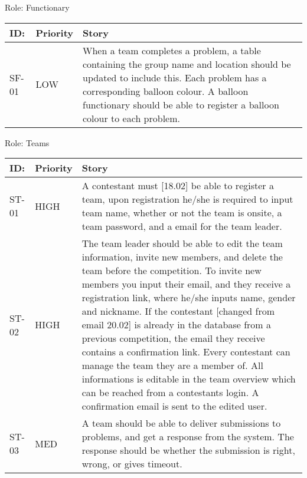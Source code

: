 \bigskip

Role: Functionary


\bigskip

\begin{flushleft}
\tablehead{}
\begin{supertabular}{|p{0.1\textwidth}|p{0.1\textwidth}|p{0.8\textwidth}|}
\hline
ID: &
Priority &
Story\\\hline
SF{}-01 &
LOW &
When a team completes a problem, a table containing the group name and
location should be updated to include this. Each problem has a
corresponding balloon colour. A balloon functionary should be able to
register a balloon colour to each problem.\\\hline
\end{supertabular}
\end{flushleft}

\bigskip


\bigskip

Role: Teams

\begin{flushleft}
\tablehead{}
\begin{supertabular}{|p{0.1\textwidth}|p{0.1\textwidth}|p{0.8\textwidth}|}
\hline
ID: &
Priority &
Story\\\hline
ST{}-01 &
HIGH &
A contestant must [18.02] be able to register a team, upon registration
he/she is required to input team name, whether or not the team is
onsite, a team password, and a email for the team leader.\\\hline
ST{}-02 &
HIGH &
The team leader should be able to edit the team information, invite new
members, and delete the team before the competition. To invite new
members you input their email, and they receive a registration link,
where he/she inputs name, gender and nickname. If the contestant
[changed from email 20.02] is already in the database from a previous
competition, the email they receive contains a confirmation link. Every
contestant can manage the team they are a member of. All informations
is editable in the team overview which can be reached from a
contestants login. A confirmation email is sent to the edited
user.\\\hline
ST{}-03 &
MED &
A team should be able to deliver submissions to problems, and get a
response from the system. The response should be whether the submission
is right, wrong, or gives timeout.\\\hline
\end{supertabular}
\end{flushleft}
